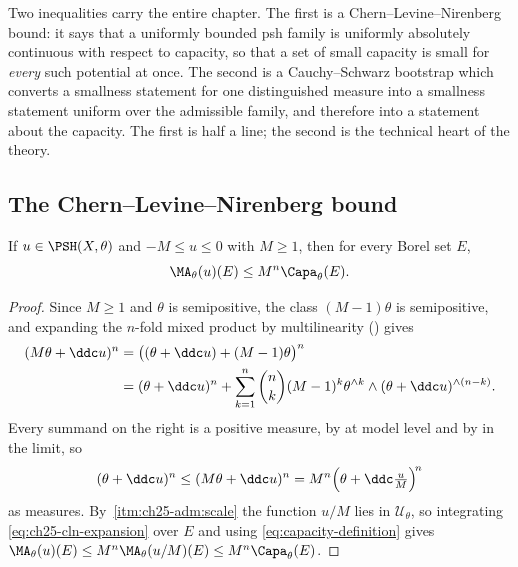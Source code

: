 Two inequalities carry the entire chapter.  The first is a
Chern--Levine--Nirenberg bound: it says that a uniformly bounded psh family
is uniformly absolutely continuous with respect to capacity, so that a set of
small capacity is small for \emph{every} such potential at once.  The second
is a Cauchy--Schwarz bootstrap which converts a smallness statement for one
distinguished measure into a smallness statement uniform over the admissible
family, and therefore into a statement about the capacity.  The first is
half a line; the second is the technical heart of the theory.

\subsection{The Chern--Levine--Nirenberg bound}
\label{sec:ch25-cln}

\begin{lemma}
\label{lem:ma-capacity-bound}
If \(u\in\PSH(X,\theta)\) and \(-M\leq u\leq0\) with \(M\geq1\), then for
every Borel set \(E\),
\begin{equation}
\label{eq:ma-capacity-bound}
                       \MA_\theta(u)(E)
                       \leq M^n\Capa_\theta(E).
\end{equation}
\end{lemma}

\begin{proof}
Since \(M\geq1\) and \(\theta\) is semipositive, the class
\((M-1)\theta\) is semipositive, and expanding the \(n\)-fold mixed product
by multilinearity () gives
\[
 \begin{aligned}
 (M\theta+\ddc u)^n
 &=\bigl((\theta+\ddc u)+(M-1)\theta\bigr)^n\\
 &=(\theta+\ddc u)^n+\sum_{k=1}^n\binom nk(M-1)^k
   \theta^{\wedge k}\wedge(\theta+\ddc u)^{\wedge(n-k)} .
 \end{aligned}
\]
Every summand on the right is a positive measure, by
 at model level and by
 in the limit, so
\begin{equation}
\label{eq:ch25-cln-expansion}
 (\theta+\ddc u)^n\leq(M\theta+\ddc u)^n
 =M^n\Bigl(\theta+\ddc\tfrac uM\Bigr)^{\! n}
\end{equation}
as measures.  By
\,\cref{itm:ch25-adm:scale} the function
\(u/M\) lies in \(\mathcal U_\theta\), so integrating
\eqref{eq:ch25-cln-expansion} over \(E\) and using
\eqref{eq:capacity-definition} gives
\(\MA_\theta(u)(E)\leq M^n\MA_\theta(u/M)(E)\leq M^n\Capa_\theta(E)\).
\end{proof}


